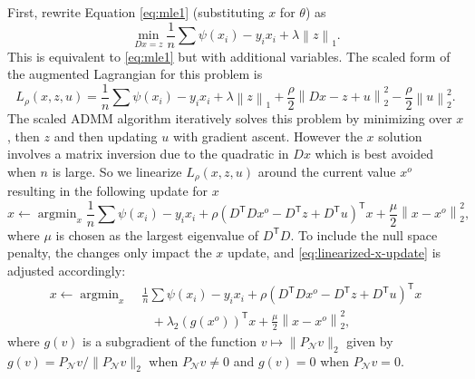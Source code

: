 \documentclass[ejs,noshowframe]{imsart}
\theoremstyle{plain}
\theoremstyle{definition}
\DeclareMathOperator*{\argmin}{argmin}
\newcommand{\cN}{\mathcal{N}}
\renewcommand{\top}{\mathsf{T}}
\begin{document}
First, rewrite Equation \eqref{eq:mle1}
(substituting $x$ for $\theta$) as
\begin{equation}
	\min_{Dx=z} \frac{1}{n}\sum \psi(x_i) - y_i x_i + \lambda \left\lVert z 
	\right\rVert_1.
\end{equation}
This is equivalent to \eqref{eq:mle1} but with additional variables.
The scaled form of the augmented Lagrangian for this problem is
\begin{equation}
	L_{\rho}(x,z,u) = \frac{1}{n}\sum \psi(x_i) - y_i x_i +
	\lambda \left\lVert z \right\rVert_1 + \frac{\rho}{2}\left\lVert Dx - z + 
	u\right\rVert_2^2
	- \frac{\rho}{2}\left\lVert u \right\rVert_2^2.
\end{equation}
\noindent
The scaled ADMM algorithm iteratively solves this problem by minimizing over 
$x$,
then $z$ and then updating $u$ with gradient ascent. However
the $x$ solution involves a matrix inversion due to the quadratic in $Dx$ which
is best avoided when $n$ is large. So we linearize $L_\rho(x,z,u)$ around the
current value $x^o$ resulting in the following update for $x$
\begin{equation}
	\label{eq:linearized-x-update}
	x \leftarrow \argmin_x \frac{1}{n}\sum \psi(x_i) - y_i x_i +
	\rho \left(D^\top D x^o - D^\top z + D^\top u\right)^\top x +
	\frac{\mu}{2}\left\lVert x-x^o \right\rVert_2^2, 
\end{equation}
where $\mu$ is chosen as the largest eigenvalue of $D^\top D$.
To include the null space penalty,
the changes only impact the $x$ update,
and \eqref{eq:linearized-x-update} is adjusted accordingly:
\begin{align*}
  x \leftarrow \argmin_x
  &\; \frac{1}{n}\sum \psi(x_i) - y_i x_i + \rho \left(D^\top D
    x^o -D^\top z + D^\top u\right)^\top x \\
  &\quad + \lambda_2 (g(x^o))^\top x +
    \frac{\mu}{2}\left\lVert x-x^o \right\rVert_2^2,
\end{align*}
where $g(v)$ is a subgradient of the function $v \mapsto \|P_\cN v\|_2$ given by
$ g(v) = P_\cN v / \| P_\cN v\|_2$ when $P_\cN v \neq 0$ and 
$g(v) = 0$ when $P_\cN v = 0$.

\end{document}
